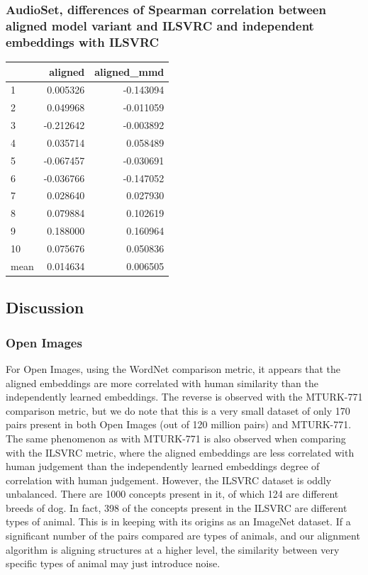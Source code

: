 \subsubsection{AudioSet, differences of Spearman correlation between aligned model variant and ILSVRC and independent embeddings with ILSVRC}

\begin{tabular}{lrr}
\toprule
{} &   aligned &  aligned\_mmd \\
\midrule
1    &  0.005326 &    -0.143094 \\
2    &  0.049968 &    -0.011059 \\
3    & -0.212642 &    -0.003892 \\
4    &  0.035714 &     0.058489 \\
5    & -0.067457 &    -0.030691 \\
6    & -0.036766 &    -0.147052 \\
7    &  0.028640 &     0.027930 \\
8    &  0.079884 &     0.102619 \\
9    &  0.188000 &     0.160964 \\
10   &  0.075676 &     0.050836 \\
\midrule
mean &  0.014634 &     0.006505 \\
\bottomrule
\end{tabular}


\subsection{Discussion}

\subsubsection{Open Images}

For Open Images, using the WordNet comparison metric, it appears that the aligned embeddings are more correlated with human similarity than the independently learned embeddings. The reverse is observed with the MTURK-771 comparison metric, but we do note that this is a very small dataset of only 170 pairs present in both Open Images (out of 120 million pairs) and MTURK-771. The same phenomenon as with MTURK-771 is also observed when comparing with the ILSVRC metric, where the aligned embeddings are less correlated with human judgement than the independently learned embeddings degree of correlation with human judgement. However, the ILSVRC dataset is oddly unbalanced. There are 1000 concepts present in it, of which 124 are different breeds of dog. In fact, 398 of the concepts present in the ILSVRC are different types of animal. This is in keeping with its origins as an ImageNet  dataset. If a significant number of the pairs compared are types of animals, and our alignment algorithm is aligning structures at a higher level, the similarity between very specific types of animal may just introduce noise. 


